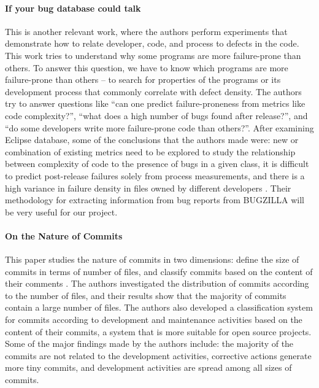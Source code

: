 \paragraph{If your bug database could talk}
This is another relevant work, where the authors perform experiments
that demonstrate how to relate developer, code, and process to defects
in the code. This work tries to understand why some programs are more
failure-prone than others.  To answer this question, we have to know
which programs are more failure-prone than others – to search for
properties of the programs or its development process that commonly
correlate with defect density. The authors try to answer questions
like “can one predict failure-proneness from metrics like code
complexity?”, “what does a high number of bugs found after release?”,
and “do some developers write more failure-prone code than
others?”. After examining Eclipse database, some of the conclusions
that the authors made were: new or combination of existing metrics
need to be explored to study the relationship between complexity of
code to the presence of bugs in a given class, it is difficult to
predict post-release failures solely from process measurements, and
there is a high variance in failure density in files owned by
different developers \cite{2006-if}. Their methodology for extracting
information from bug reports from BUGZILLA will be very useful for our
project.

\paragraph{On the Nature of Commits}
This paper studies the nature of commits in two dimensions: define the
size of commits in terms of number of files, and classify commits
based on the content of their comments \cite{hattori2008nature}. The
authors investigated the distribution of commits according to the
number of files, and their results show that the majority of commits
contain a large number of files. The authors also developed a
classification system for commits according to development and
maintenance activities based on the content of their commits, a system
that is more suitable for open source projects. Some of the major
findings made by the authors include: the majority of the commits are
not related to the development activities, corrective actions generate
more tiny commits, and development activities are spread among all
sizes of commits.

